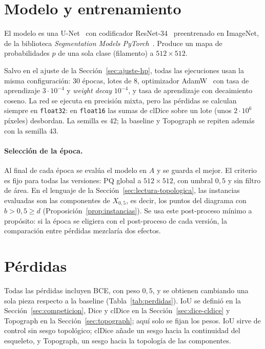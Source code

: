 \section{Modelo y entrenamiento}
\label{sec:entrenamiento}

El modelo es una U-Net~\cite{ronneberger2015} con codificador
ResNet-34~\cite{he2016} preentrenado en ImageNet, de la biblioteca
\emph{Segmentation Models PyTorch}~\cite{iakubovskii2019}. Produce un
mapa de probabilidades $p$ de una sola clase (filamento) a
$512\times512$.

Salvo en el ajuste de la Sección~\ref{sec:ajuste-hp}, todas las
ejecuciones usan la misma configuración: 30 épocas, lotes de 8,
optimizador AdamW~\cite{loshchilov2019} con tasa de aprendizaje
$3\cdot10^{-4}$ y \emph{weight decay} $10^{-4}$, y tasa de aprendizaje
con decaimiento coseno. La red se ejecuta en precisión mixta, pero las
pérdidas se calculan siempre en \texttt{float32}: en \texttt{float16}
las sumas de clDice sobre un lote (unos $2\cdot10^6$ píxeles) desbordan.
La semilla es 42; la baseline y Topograph se repiten además con la
semilla 43.

\paragraph{Selección de la época.} Al final de cada época se evalúa el
modelo en $A$ y se guarda el mejor. El criterio es fijo para todas las
versiones: PQ global a $512\times512$, con umbral $0{,}5$ y sin filtro
de área. En el lenguaje de la Sección~\ref{sec:lectura-topologica}, las
instancias evaluadas son las componentes de $X_{0{,}5}$, es decir, los
puntos del diagrama con $b>0{,}5\ge d$
(Proposición~\ref{prop:instancias}). Se usa este post-proceso mínimo a
propósito: si la época se eligiera con el post-proceso de cada versión,
la comparación entre pérdidas mezclaría dos efectos.

\section{Pérdidas}
\label{sec:perdidas}

Todas las pérdidas incluyen BCE, con peso $0{,}5$, y se obtienen
cambiando una sola pieza respecto a la baseline
(Tabla~\ref{tab:perdidas}). IoU se definió en la
Sección~\ref{sec:competicion}, Dice y clDice en la
Sección~\ref{sec:dice-cldice} y Topograph en la
Sección~\ref{sec:topograph}; aquí solo se fijan los pesos. IoU sirve de
control sin sesgo topológico; clDice añade un sesgo hacia la
continuidad del esqueleto, y Topograph, un sesgo hacia la topología de
las componentes.

